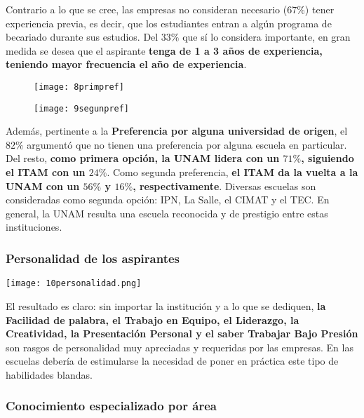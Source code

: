 \documentclass{article}
\begin{document}
Contrario a lo que se cree, las empresas no consideran necesario ($67\%$) tener experiencia previa, es decir, que los estudiantes entran a algún programa de becariado durante sus estudios. Del $33\%$ que sí lo considera importante, en gran medida se desea que el aspirante \textbf{tenga de 1 a 3 años de experiencia, teniendo mayor frecuencia el año de experiencia}. 

\begin{figure}[h!]
\centering
\begin{minipage}{.5\textwidth}
  \centering
  \texttt{[image: 8primpref]}
\end{minipage}%
\begin{minipage}{.5\textwidth}
  \centering
  \texttt{[image: 9segunpref]}
\end{minipage}
\end{figure}

Además, pertinente a la \textbf{Preferencia por alguna universidad de origen}, el $82\%$ argumentó que no tienen una preferencia por alguna escuela en particular. Del resto, \textbf{como primera opción, la UNAM lidera con un $71\%$, siguiendo el ITAM con un $24\%$}. Como segunda preferencia, \textbf{el ITAM da la vuelta a la UNAM con un $56\%$ y $16\%$, respectivamente}. Diversas escuelas son consideradas como segunda opción: IPN, La Salle, el CIMAT y el TEC. En general, la UNAM resulta una escuela reconocida y de prestigio entre estas instituciones. 

\subsubsection{Personalidad de los aspirantes}

\begin{center}
    \texttt{[image: 10personalidad.png]}
\end{center}

El resultado es claro: sin importar la institución y a lo que se dediquen, \textbf{la Facilidad de palabra, el Trabajo en Equipo, el Liderazgo, la Creatividad, la Presentación Personal y el saber Trabajar Bajo Presión} son rasgos de personalidad muy apreciadas y requeridas por las empresas. En las escuelas debería de estimularse la necesidad de poner en práctica este tipo de habilidades blandas. 

\subsubsection{Conocimiento especializado por área}
\end{document}
